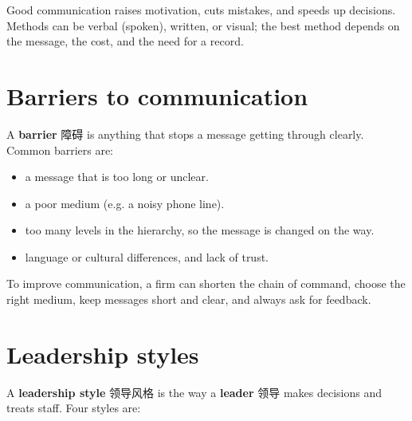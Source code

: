 \documentclass[11pt]{article}
\begin{document}
Good communication raises motivation, cuts mistakes, and speeds up decisions. Methods can be verbal (spoken), written, or visual; the best method depends on the message, the cost, and the need for a record.

\section*{Barriers to communication}

A \textbf{barrier} 障碍 is anything that stops a message getting through clearly. Common barriers are:

\begin{itemize}
\item a message that is too long or unclear.

\item a poor medium (e.g. a noisy phone line).

\item too many levels in the hierarchy, so the message is changed on the way.

\item language or cultural differences, and lack of trust.

\end{itemize}

To improve communication, a firm can shorten the chain of command, choose the right medium, keep messages short and clear, and always ask for feedback.

\section*{Leadership styles}

A \textbf{leadership style} 领导风格 is the way a \textbf{leader} 领导 makes decisions and treats staff. Four styles are:

\begin{center}
\end{center}
\end{document}
